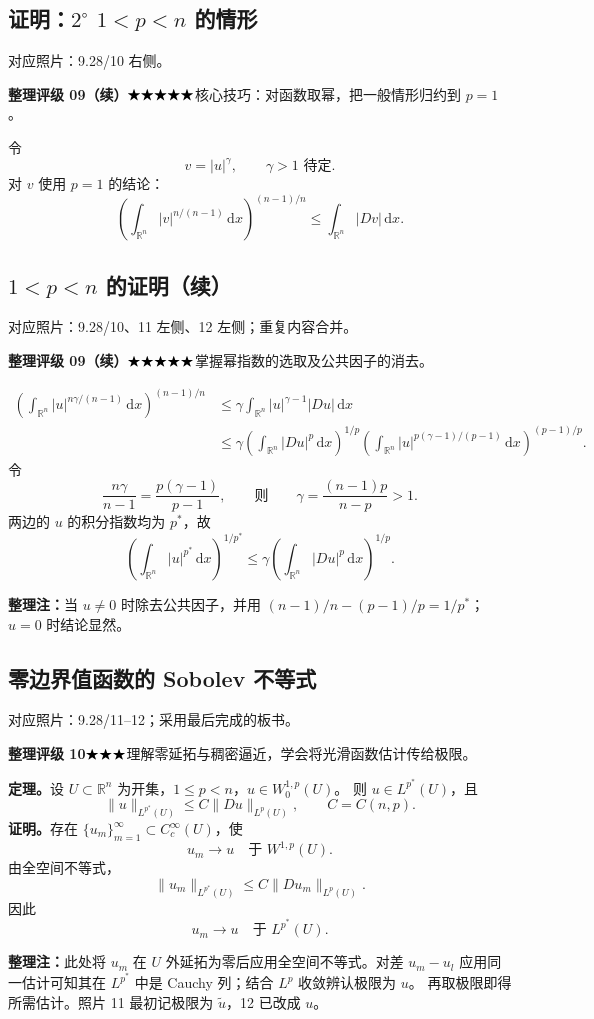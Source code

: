 \documentclass[UTF8,a4paper,11pt,fontset=fandol]{ctexart}
\newcommand{\R}{\mathbb R}
\newcommand{\dd}{\,\mathrm d}
\newcommand{\ednote}[1]{\par{\small\color{notegray}\textbf{整理注：}#1}\par}
\newcommand{\source}[1]{{\small\color{notegray}对应照片：#1。}\par}
\newcommand{\proofstars}[1]{\ensuremath{%
\ifnum#1>0\relax\bigstar\fi
\ifnum#1>1\relax\bigstar\fi
\ifnum#1>2\relax\bigstar\fi
\ifnum#1>3\relax\bigstar\fi
\ifnum#1>4\relax\bigstar\fi}}
\newcommand{\proofrating}[3]{\par{\small\color{proofblue}%
\textbf{整理评级 #1}\enspace\proofstars{#2}\quad #3\par}}
\begin{document}
\subsection*{证明：$2^\circ$ $1<p<n$ 的情形}
\source{9.28/10 右侧}
\proofrating{09（续）}{5}{核心技巧：对函数取幂，把一般情形归约到 $p=1$。}
令
\[
v=|u|^\gamma,\qquad\gamma>1\text{ 待定}.
\]
对 $v$ 使用 $p=1$ 的结论：
\[
\left(\int_{\R^n}|v|^{n/(n-1)}\dd x\right)^{(n-1)/n}
\leq\int_{\R^n}|Dv|\dd x.
\]

\newpage
\subsection*{$1<p<n$ 的证明（续）}
\source{9.28/10、11 左侧、12 左侧；重复内容合并}
\proofrating{09（续）}{5}{掌握幂指数的选取及公共因子的消去。}
\[
\begin{aligned}
\left(\int_{\R^n}|u|^{n\gamma/(n-1)}\dd x\right)^{(n-1)/n}
&\leq\gamma\int_{\R^n}|u|^{\gamma-1}|Du|\dd x\\
&\leq\gamma\left(\int_{\R^n}|Du|^p\dd x\right)^{1/p}
\left(\int_{\R^n}|u|^{p(\gamma-1)/(p-1)}\dd x\right)^{(p-1)/p}.
\end{aligned}
\]
令
\[
\frac{n\gamma}{n-1}=\frac{p(\gamma-1)}{p-1},
\qquad\text{则}\qquad
\gamma=\frac{(n-1)p}{n-p}>1.
\]
两边的 $u$ 的积分指数均为 $p^*$，故
\[
\boxed{\left(\int_{\R^n}|u|^{p^*}\dd x\right)^{1/p^*}
\leq\gamma\left(\int_{\R^n}|Du|^p\dd x\right)^{1/p}.}
\]
\ednote{当 $u\ne0$ 时除去公共因子，并用
$(n-1)/n-(p-1)/p=1/p^*$；$u=0$ 时结论显然。}

\subsection{零边界值函数的 Sobolev 不等式}
\source{9.28/11--12；采用最后完成的板书}
\proofrating{10}{3}{理解零延拓与稠密逼近，学会将光滑函数估计传给极限。}
\textbf{定理。}设 $U\subset\R^n$ 为开集，$1\leq p<n$，$u\in W_0^{1,p}(U)$。
则 $u\in L^{p^*}(U)$，且
\[
\|u\|_{L^{p^*}(U)}\leq C\|Du\|_{L^p(U)},\qquad C=C(n,p).
\]
\textbf{证明。}存在 $\{u_m\}_{m=1}^\infty\subset C_c^\infty(U)$，使
\[
u_m\to u\quad\text{于 }W^{1,p}(U).
\]
由全空间不等式，
\[
\|u_m\|_{L^{p^*}(U)}\leq C\|Du_m\|_{L^p(U)}.
\]
因此
\[
u_m\to u\quad\text{于 }L^{p^*}(U).
\]
\ednote{此处将 $u_m$ 在 $U$ 外延拓为零后应用全空间不等式。对差 $u_m-u_l$
应用同一估计可知其在 $L^{p^*}$ 中是 Cauchy 列；结合 $L^p$ 收敛辨认极限为 $u$。
再取极限即得所需估计。照片 11 最初记极限为 $\widetilde u$，12 已改成 $u$。}

\newpage
\end{document}
